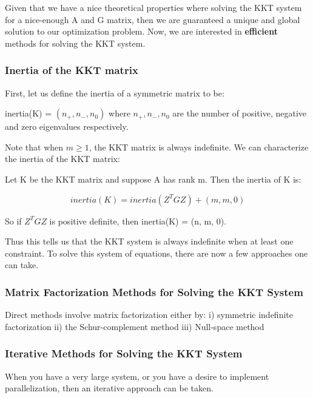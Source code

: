 \documentclass[class=article, crop=false]{standalone}
\begin{document}
		Given that we have a nice theoretical properties where solving the KKT system for a nice-enough A and G matrix, then we are guaranteed a unique and global solution to our optimization problem. Now, we are interested in \textbf{efficient} methods for solving the KKT system. 

		\subsubsection{Inertia of the KKT matrix}
			First, let us define the inertia of a symmetric matrix to be:

			\begin{definition} [inertia]
				inertia(K) = $(n_+, n_-, n_0)$ where $n_+, n_-, n_0$ are the number of positive, negative and zero eigenvalues respectively.
			\end{definition}

			Note that when $m \ge 1$, the KKT matrix is always indefinite. We can characterize the inertia of the KKT matrix:

			\begin{theorem} 
				Let K be the KKT matrix and suppose A has rank m. Then the inertia of K is:

					$$inertia(K) = inertia(Z^T G Z) + (m, m, 0)$$

				So if $Z^T G Z$ is positive definite, then inertia(K) = (n, m, 0).
			\end{theorem}

			Thus this tells us that the KKT system is always indefinite when at least one constraint. To solve this system of equations, there are now a few approaches one can take.

		\subsubsection{Matrix Factorization Methods for Solving the KKT System}
			Direct methods involve matrix factorization either by: 
			i) symmetric indefinite factorization
			ii) the Schur-complement method
			iii) Null-space method

		\subsubsection{Iterative Methods for Solving the KKT System}
			When you have a very large system, or you have a desire to implement parallelization, then an iterative approach can be taken.
\end{document}
